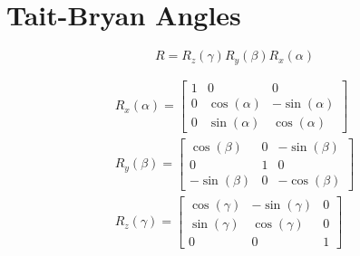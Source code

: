 \section{Tait-Bryan Angles}

\begin{equation}
    R = R_z(\gamma) R_y(\beta) R_x(\alpha)
\end{equation}

\begin{gather}
    R_x(\alpha) =
    \begin{bmatrix}
        1 & 0            & 0             \\
        0 & \cos(\alpha) & -\sin(\alpha) \\
        0 & \sin(\alpha) & \cos(\alpha)
    \end{bmatrix} \\
    R_y(\beta) =
    \begin{bmatrix}
        \cos(\beta)  & 0 & -\sin(\beta) \\
        0            & 1 & 0            \\
        -\sin(\beta) & 0 & -\cos(\beta)
    \end{bmatrix} \\ 
    R_z(\gamma) =
    \begin{bmatrix}
        \cos(\gamma) & -\sin(\gamma) & 0 \\
        \sin(\gamma) & \cos(\gamma)  & 0 \\
        0            & 0             & 1
    \end{bmatrix}
\end{gather}
